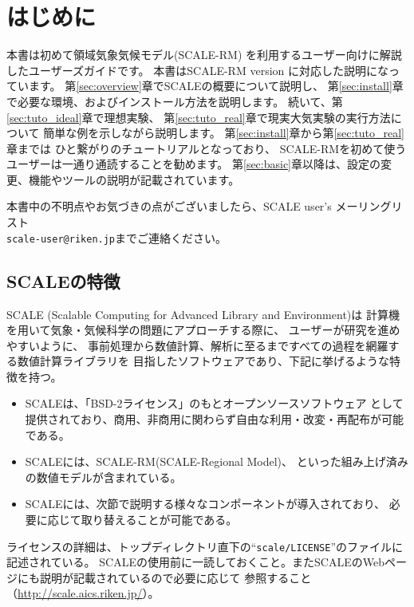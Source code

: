 \section{はじめに}

本書は初めて領域気象気候モデル(SCALE-RM)
を利用するユーザー向けに解説したユーザーズガイドです。
本書はSCALE-RM version \version に対応した説明になっています。
第\ref{sec:overview}章でSCALEの概要について説明し、
第\ref{sec:install}章で必要な環境、およびインストール方法を説明します。
続いて、第\ref{sec:tuto_ideal}章で理想実験、
第\ref{sec:tuto_real}章で現実大気実験の実行方法について
簡単な例を示しながら説明します。
第\ref{sec:install}章から第\ref{sec:tuto_real}章までは
ひと繋がりのチュートリアルとなっており、
SCALE-RMを初めて使うユーザーは一通り通読することを勧めます。
第\ref{sec:basic}章以降は、設定の変更、機能やツールの説明が記載されています。

本書中の不明点やお気づきの点がございましたら、SCALE user's メーリングリスト\\
 \verb|scale-user@riken.jp|までご連絡ください。



\subsection{SCALEの特徴}

SCALE (Scalable Computing for Advanced Library and Environment)は
計算機を用いて気象・気候科学の問題にアプローチする際に、
ユーザーが研究を進めやすいように、
事前処理から数値計算、解析に至るまですべての過程を網羅する数値計算ライブラリを
目指したソフトウェアであり、下記に挙げるような特徴を持つ。
\begin{itemize}
\item SCALEは、「BSD-2ライセンス」のもとオープンソースソフトウェア
として提供されており、商用、非商用に関わらず自由な利用・改変・再配布が可能である。
\item SCALEには、SCALE-RM(SCALE-Regional Model)、
といった組み上げ済みの数値モデルが含まれている。
\item SCALEには、次節で説明する様々なコンポーネントが導入されており、
必要に応じて取り替えることが可能である。
\end{itemize}

ライセンスの詳細は、トップディレクトリ直下の``\verb|scale/LICENSE|''のファイルに記述されている。
SCALEの使用前に一読しておくこと。またSCALEのWebページにも説明が記載されているので必要に応じて
参照すること（\url{http://scale.aics.riken.jp/}）。




